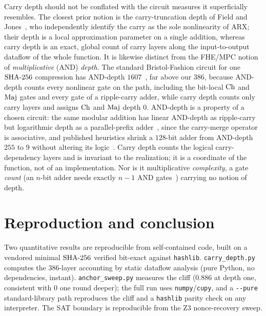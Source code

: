 \documentclass[11pt]{article}
\begin{document}
Carry depth should not be conflated with the circuit measures it
superficially resembles. The closest prior notion is the carry-truncation
depth of Field and Jones~\cite{fieldjones}, who independently identify the
carry as the sole nonlinearity of ARX; their depth is a local approximation
parameter on a single addition, whereas carry depth is an exact, global
count of carry layers along the input-to-output dataflow of the whole
function. It is likewise distinct from the FHE/MPC notion of
\emph{multiplicative} (AND) \emph{depth}. The standard Bristol-Fashion
circuit for one $\mathrm{SHA\text{-}256}$ compression has AND-depth
$1607$~\cite{bristol,multdepth}, far above our $386$, because AND-depth
counts every nonlinear gate on the path, including the bit-local $\mathrm{Ch}$ and
$\mathrm{Maj}$ gates and every gate of a ripple-carry adder, while carry depth
counts only carry layers and assigns $\mathrm{Ch}$ and $\mathrm{Maj}$ depth $0$.
AND-depth is a property of a chosen circuit: the same modular
addition has linear AND-depth as ripple-carry but logarithmic depth as a
parallel-prefix adder~\cite{cla}, since the carry-merge operator is
associative, and published heuristics shrink a $128$-bit adder from
AND-depth $255$ to $9$ without altering its logic~\cite{multdepth}. Carry
depth counts the logical carry-dependency layers and is invariant to the
realization; it is a coordinate of the function, not of an implementation.
Nor is it multiplicative \emph{complexity}, a gate \emph{count} (an
$n$-bit adder needs exactly $n{-}1$ AND gates~\cite{boyarperalta}) carrying
no notion of depth.

\section{Reproduction and conclusion}\label{sec:repro}

Two quantitative results are reproducible from self-contained code, built
on a vendored minimal $\mathrm{SHA\text{-}256}$ verified bit-exact against \texttt{hashlib}.
\texttt{carry\_depth.py} computes the $386$-layer accounting by static
dataflow analysis (pure Python, no dependencies, instant).
\texttt{anchor\_sweep.py} measures the cliff ($0.886$ at depth one,
consistent with $0$ one round deeper); the full run uses
\texttt{numpy}/\texttt{cupy}, and a \texttt{-{}-pure}
standard-library path reproduces the cliff and a \texttt{hashlib} parity
check on any interpreter. The SAT boundary is reproducible from the Z3
nonce-recovery sweep.
\end{document}
